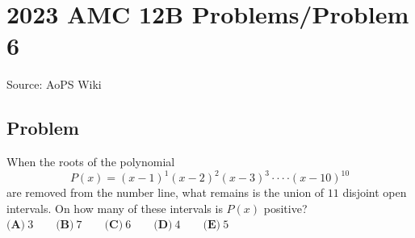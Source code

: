 \documentclass[12pt]{article}
\begin{document}
\section*{{2023 AMC 12B Problems/Problem 6}}
Source: AoPS Wiki

\subsection*{Problem}
When the roots of the polynomial \[P(x) = (x-1)^1 (x-2)^2 (x-3)^3 \cdot \cdot \cdot \cdot (x-10)^{10}\] are removed from the number line, what remains is the union of $11$ disjoint open intervals. On how many of these intervals is $P(x)$ positive? $\textbf{(A)}~3\qquad\textbf{(B)}~7\qquad\textbf{(C)}~6\qquad\textbf{(D)}~4\qquad\textbf{(E)}~5$
\end{document}

